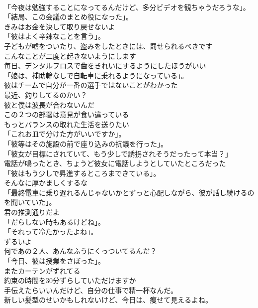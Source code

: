 \documentclass[8pt]{extreport}
\begin{document}
\begin{CJK}{UTF8}{min}
\\	「今夜は勉強することになってるんだけど、多分ビデオを観ちゃうだろうな」。	
\\	「結局、この会議のまとめ役になった」。	
\\	きみはお金を決して取り戻せないよ	
\\	「彼はよく辛辣なことを言う」。	
\\	子どもが嘘をついたり、盗みをしたときには、罰せられるべきです	
\\	こんなことが二度と起きないようにします	
\\	毎日、デンタルフロスで歯をきれいにするようにしたほうがいい	
\\	「娘は、補助輪なしで自転車に乗れるようになっている」。	
\\	彼はチームで自分が一番の選手ではないことがわかった	
\\	最近、釣りしてるのかい？	
\\	彼と僕は波長が合わないんだ	
\\	この２つの部署は意見が食い違っている	
\\	もっとバランスの取れた生活を送りたい	
\\	「これお皿で分けた方がいいですか」。	
\\	「彼等はその施設の前で座り込みの抗議を行った」。	
\\	「彼女が目標にされていて、もう少しで誘拐されそうだったって本当？」	
\\	電話が鳴ったとき、ちょうど彼女に電話しようとしていたところだった	
\\	「彼はもう少しで昇進するところまできている」。	
\\	そんなに厚かましくするな	
\\	「最終電車に乗り遅れるんじゃないかとずっと心配しながら、彼が話し続けるのを聞いていた」。	
\\	君の推測通りだよ	
\\	「だらしない時もあるけどね」。	
\\	「それって冷たかったよね」。	
\\	ずるいよ	
\\	何であの２人、あんなふうにくっついてるんだ？	
\\	「今日、彼は授業をさぼった」。	
\\	またカーテンがずれてる	
\\	約束の時間を30分ずらしていただけますか	
\\	手伝えたらいいんだけど、自分の仕事で精一杯なんだ。	
\\	新しい髪型のせいかもしれないけど、今日は、痩せて見えるよね。	

\end{CJK}
\end{document}
